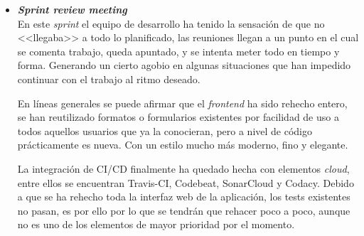 \begin{itemize}
\item \textbf{\textit{Sprint review meeting}}\\
En este \textit{sprint} el equipo de desarrollo ha tenido la sensación de que no <<llegaba>> a todo lo planificado, las reuniones llegan a un punto en el cual se comenta trabajo, queda apuntado, y se intenta meter todo en tiempo y forma. Generando un cierto agobio en algunas situaciones que han impedido continuar con el trabajo al ritmo deseado.

En líneas generales se puede afirmar que el \textit{frontend} ha sido rehecho entero, se han reutilizado formatos o formularios existentes por facilidad de uso a todos aquellos usuarios que ya la conocieran, pero a nivel de código prácticamente es nueva. Con un estilo mucho más moderno, fino y elegante.

La integración de CI/CD finalmente ha quedado hecha con elementos \textit{cloud}, entre ellos se encuentran Travis-CI, Codebeat, SonarCloud y Codacy. Debido a que se ha rehecho toda la interfaz web de la aplicación, los tests existentes no pasan, es por ello por lo que se tendrán que rehacer poco a poco, aunque no es uno de los elementos de mayor prioridad por el momento.

\end{itemize}

